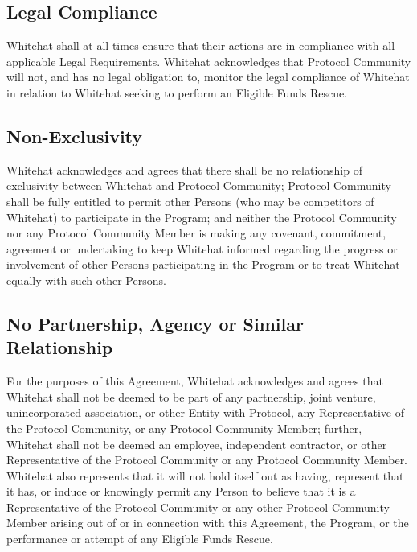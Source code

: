 \documentclass{article}
\begin{document}
\subsection{Legal Compliance}\label{subsec:legal_compliance}

Whitehat shall at all times ensure that their actions are in compliance with all applicable Legal Requirements. Whitehat acknowledges that Protocol Community will not, and has no legal obligation to, monitor the legal compliance of Whitehat in relation to Whitehat seeking to perform an Eligible Funds Rescue.

\subsection{Non-Exclusivity}\label{subsec:non_exclusivity}

Whitehat acknowledges and agrees that there shall be no relationship of exclusivity between Whitehat and Protocol Community; Protocol Community shall be fully entitled to permit other Persons (who may be competitors of Whitehat) to participate in the Program; and neither the Protocol Community nor any Protocol Community Member is making any covenant, commitment, agreement or undertaking to keep Whitehat informed regarding the progress or involvement of other Persons participating in the Program or to treat Whitehat equally with such other Persons.

\subsection{No Partnership, Agency or Similar Relationship}\label{subsec:no_partnership}

For the purposes of this Agreement, Whitehat acknowledges and agrees that Whitehat shall not be deemed to be part of any partnership, joint venture, unincorporated association, or other Entity with Protocol, any Representative of the Protocol Community, or any Protocol Community Member; further, Whitehat shall not be deemed an employee, independent contractor, or other Representative of the Protocol Community or any Protocol Community Member. Whitehat also represents that it will not hold itself out as having, represent that it has, or induce or knowingly permit any Person to believe that it is a Representative of the Protocol Community or any other Protocol Community Member arising out of or in connection with this Agreement, the Program, or the performance or attempt of any Eligible Funds Rescue.
\end{document}
